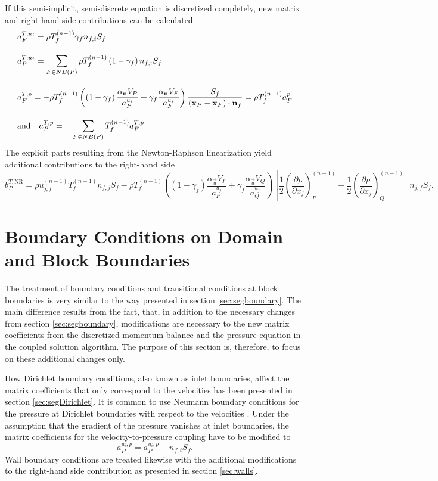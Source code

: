 If this semi-implicit, semi-discrete equation is discretized completely, new matrix and right-hand side contributions can be calculated
\begin{align*}
  \allowdisplaybreaks
  &a_F^{T,u_i} = \rho T_f^{(n-1)} \gamma_f n_{f,i} S_f \\[1.0em] 
  &a_P^{T,u_i} = \sum_{F \in NB(P)} \rho T_f^{(n-1)} \left(1-\gamma_f\right) n_{f,i} S_f \\[1.0em]
  &a_F^{T,p} = -\rho T_f^{(n-1)} \left(\left(1 - \gamma_f\right) \frac{\alpha_\vec{u} V_P}{a_P^{u_i}} + \gamma_f \frac{\alpha_\vec{u} V_F}{a_F^{u_i}}\right) \frac{S_f}{\left(\vec{x}_P - \vec{x}_F\right) \cdot \vec{n}_f} = \rho T_f^{(n-1)} a_F^{p} \\[1.0em] 
  &\text{and} \quad
  a_P^{T,p} = - \sum_{F \in NB(P)} T_f^{(n-1)} a_F^{T,p}.
\end{align*}
The explicit parts resulting from the Newton-Raphson linearization yield additional contributions to the right-hand side
\begin{displaymath}
  b_P^{T,\text{NR}} 
  = 
  \rho u_{j,f}^{(n-1)} T_f^{(n-1)} n_{f,j} S_f 
  - \rho T_f^{(n-1)} \left(\left(1 - \gamma_f\right) \frac{\alpha_\vec{u} V_P}{a_P^{u_j}} + \gamma_f \frac{\alpha_\vec{u} V_Q}{a_Q^{u_j}}\right)
    \left[ 
    \frac{1}{2} \left( \frac{\partial p}{\partial x_j} \right)_P^{(n-1)} 
    + \frac{1}{2} \left(\frac{\partial p}{\partial x_j}\right)_Q^{(n-1)} 
    \right] n_{j,f} S_f.
\end{displaymath}

\section{Boundary Conditions on Domain and Block Boundaries}

The treatment of boundary conditions and transitional conditions at block boundaries is very similar to the way presented in section \ref{sec:segboundary}. The main difference results from the fact, that, in addition to the necessary changes from section \ref{sec:segboundary}, modifications are necessary to the new matrix coefficients from the discretized momentum balance and the pressure equation in the coupled solution algorithm. The purpose of this section is, therefore, to focus on these additional changes only.

How Dirichlet boundary conditions, also known as inlet boundaries, affect the matrix coefficients that only correspond to the velocities has been presented in section \ref{sec:segDirichlet}. It is common to use Neumann boundary conditions for the pressure at Dirichlet boundaries with respect to the velocities \cite{darwish09}. Under the assumption that the gradient of the pressure vanishes at inlet boundaries, the matrix coefficients for the velocity-to-pressure coupling have to be modified to 
\begin{displaymath}
  a_P^{u_i,p} = a_P^{u_i,p} + n_{f,i} S_f.
\end{displaymath}
Wall boundary conditions are treated likewise with the additional modifications to the right-hand side contribution as presented in section \ref{sec:walls}.

